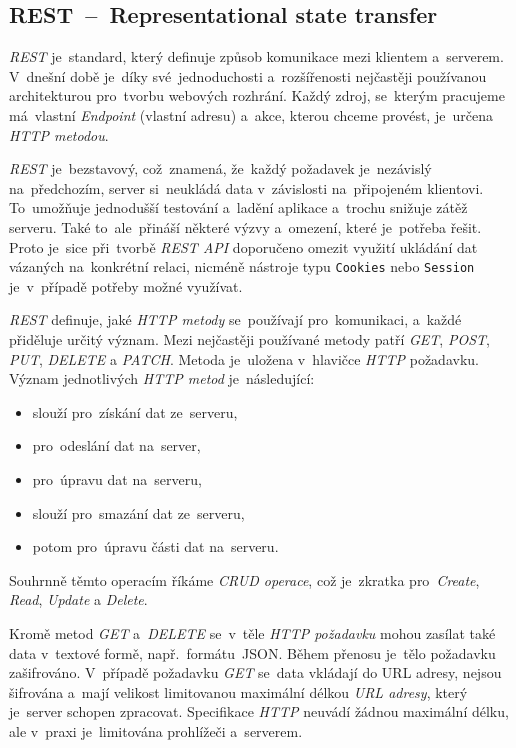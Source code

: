 \documentclass[10pt,a4paper]{article}
\newcommand{\harddata}[1]{\boxed{\texttt{#1}}}
\begin{document}
        \subsection{REST~--~Representational state transfer}
        \emph{REST} je~standard, který definuje způsob komunikace mezi klientem a~serverem. V~dnešní době je~díky své~jednoduchosti a~rozšířenosti nejčastěji používanou architekturou pro~tvorbu webových rozhrání. Každý zdroj, se~kterým pracujeme má~vlastní \emph{Endpoint} (vlastní adresu) a~akce, kterou chceme provést, je~určena \emph{HTTP metodou}.
        
        \emph{REST} je~bezstavový, což~znamená, že~každý požadavek je~nezávislý na~předchozím, server si~neukládá data v~závislosti na~připojeném klientovi. To~umožňuje jednodušší testování a~ladění aplikace a~trochu snižuje zátěž serveru. Také to~ale~přináší některé výzvy a~omezení, které je~potřeba řešit. Proto je~sice při~tvorbě \emph{REST API} doporučeno omezit využití ukládání dat vázaných na~konkrétní relaci, nicméně nástroje typu \texttt{Cookies} nebo \texttt{Session} je~v~případě potřeby možné využívat.
        
        \emph{REST} definuje, jaké \emph{HTTP metody} se~používají pro~komunikaci, a~každé přiděluje určitý význam. Mezi nejčastěji používané metody patří \emph{GET}, \emph{POST}, \emph{PUT}, \emph{DELETE} a \emph{PATCH}. Metoda je~uložena v~hlavičce \emph{HTTP} požadavku. Význam jednotlivých \emph{HTTP metod} je~následující:
        
        \begin{itemize}
            \item \harddata{GET} slouží pro~získání dat ze~serveru,
            \item \harddata{POST} pro~odeslání dat na~server,
            \item \harddata{PUT} pro~úpravu dat na~serveru,
            \item \harddata{DELETE} slouží pro~smazání dat ze~serveru,
            \item \harddata{PATCH} potom pro~úpravu části dat na~serveru.
        \end{itemize}

        Souhrnně těmto operacím říkáme \emph{CRUD operace}, což je~zkratka pro~\emph{Create}, \emph{Read}, \emph{Update} a \emph{Delete}.

        Kromě metod \emph{GET} a~\emph{DELETE} se~v~těle \emph{HTTP požadavku} mohou zasílat také data v~textové formě, např.~formátu~JSON. Během přenosu je~tělo požadavku zašifrováno. V~případě požadavku \emph{GET} se~data vkládají do URL adresy, nejsou šifrována a~mají velikost limitovanou maximální délkou \emph{URL adresy}, který je~server schopen zpracovat. Specifikace \emph{HTTP} neuvádí žádnou maximální délku, ale v~praxi je~limitována prohlížeči a~serverem. \cite[3.2.1]{ietf-httpbis-messaging-03}
\end{document}
